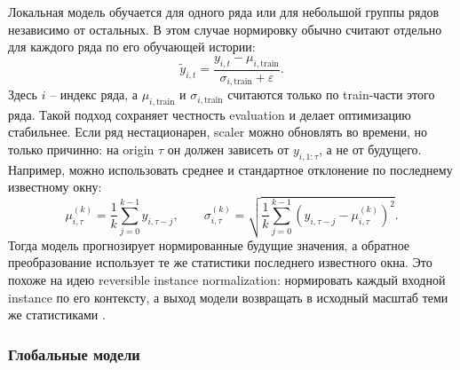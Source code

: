 \documentclass[12pt,fleqn]{article}
\begin{document}
Локальная модель обучается для одного ряда или для небольшой группы рядов независимо от остальных.
В этом случае нормировку обычно считают отдельно для каждого ряда по его обучающей истории:
\begin{equation}
  \widetilde{y}_{i,t}
  =
  \frac{y_{i,t}-\mu_{i,\mathrm{train}}}{\sigma_{i,\mathrm{train}}+\varepsilon}.
\end{equation}
Здесь $i$ -- индекс ряда, а $\mu_{i,\mathrm{train}}$ и $\sigma_{i,\mathrm{train}}$ считаются только по train-части этого ряда.
Такой подход сохраняет честность evaluation и делает оптимизацию стабильнее.
Если ряд нестационарен, scaler можно обновлять во времени, но только причинно: на origin $\tau$ он должен зависеть от $y_{i,1:\tau}$, а не от будущего.
Например, можно использовать среднее и стандартное отклонение по последнему известному окну:
\begin{equation}
  \mu_{i,\tau}^{(k)} =
  \frac{1}{k}\sum_{j=0}^{k-1} y_{i,\tau-j},
  \qquad
  \sigma_{i,\tau}^{(k)}
  =
  \sqrt{
    \frac{1}{k}\sum_{j=0}^{k-1}
    (y_{i,\tau-j}-\mu_{i,\tau}^{(k)})^2
  }.
\end{equation}
Тогда модель прогнозирует нормированные будущие значения, а обратное преобразование использует те же статистики последнего известного окна.
Это похоже на идею reversible instance normalization: нормировать каждый входной instance по его контексту, а выход модели возвращать в исходный масштаб теми же статистиками \cite{kim2022revin}.

\subsubsection{Глобальные модели}
\end{document}
